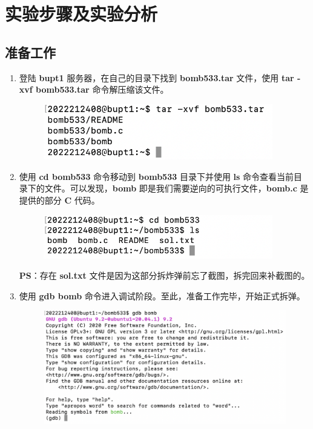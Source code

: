 \section{实验步骤及实验分析}
    \subsection{准备工作}
        \begin{enumerate}
            \item 登陆 \textbf{bupt1} 服务器，在自己的目录下找到 \textbf{bomb533.tar} 文件，使用 \textbf{tar -xvf bomb533.tar} 命令解压缩该文件。
                \begin{figure}[htbp]
                    \centering
                    \includegraphics*[width = 10cm]{s0_0.png}
                \end{figure}
            \item 使用 \textbf{cd bomb533} 命令移动到 \textbf{bomb533} 目录下并使用 \textbf{ls} 命令查看当前目录下的文件。可以发现，\textbf{bomb} 即是我们需要逆向的可执行文件，\textbf{bomb.c} 是提供的部分 \textbf{C} 代码。
                \begin{figure}[htbp]
                    \centering
                    \includegraphics*[width = 10cm]{s0_1.png}
                \end{figure}
                \par \textbf{PS}：存在 \textbf{sol.txt} 文件是因为这部分拆炸弹前忘了截图，拆完回来补截图的。
            \item 使用 \textbf{gdb bomb} 命令进入调试阶段。至此，准备工作完毕，开始正式拆弹。
                \begin{figure}[htbp]
                    \centering
                    \includegraphics*[width = 12cm]{s0_2.png}
                \end{figure}
        \end{enumerate}

